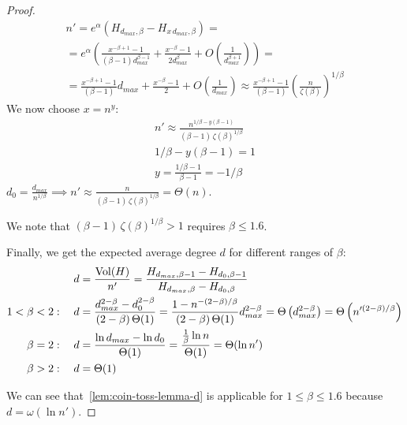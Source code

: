 \begin{proof}
\begin{gather*}
        n'=e^\alpha\left(H_{d_{max},\beta}-H_{x\,d_{max},\beta}\right)=\\
        =e^\alpha\left(
            \frac{x^{-\beta+1}-1}{(\beta-1)d_{max}^{\beta-1}}
            +\frac{x^{-\beta}-1}{2d_{max}^\beta}
            +O\left(\frac{1}{d_{max}^{\beta+1}}\right)
        \right)=\\
        =\frac{x^{-\beta+1}-1}{(\beta-1)}d_{max}
        +\frac{x^{-\beta}-1}{2}
        +O\left(\frac{1}{d_{max}}\right)
        \approx\frac{x^{-\beta+1}-1}{(\beta-1)}\left(\frac{n}{\zeta(\beta)}\right)^{1/\beta}
    \end{gather*}
    We now choose $x=n^y$:
    \begin{gather*}
        n'\approx\frac{n^{1/\beta-y(\beta-1)}}{(\beta-1)\,\zeta(\beta)^{1/\beta}}\\
        1/\beta-y(\beta-1)=1\\
        y=\frac{1/\beta-1}{\beta-1}=-1/\beta
    \end{gather*}
    $d_0=\frac{d_{max}}{n^{1/\beta}}\implies
    n'\approx\frac{n}{(\beta-1)\,\zeta(\beta)^{1/\beta}}=\Theta(n)$.
        
    We note that $(\beta-1)\,\zeta(\beta)^{1/\beta}>1$ requires $\beta\leq 1.6$.

    Finally, we get the expected average degree $d$ for different ranges of $\beta$:
    \begin{align*}
        d&=\frac{\operatorname*{Vol}(H)}{n'}=\frac{H_{d_{max},\beta-1}-H_{d_0,\beta-1}}{H_{d_{max},\beta}-H_{d_0,\beta}}\\
        1<\beta<2:\quad d&=\frac{d_{max}^{2-\beta}-d_0^{2-\beta}}{(2-\beta)\,\Theta(1)}
        =\frac{1-n^{-(2-\beta)/\beta}}{(2-\beta)\,\Theta(1)}d_{max}^{2-\beta}=\Theta\left(d_{max}^{2-\beta}\right)=\Theta\left(n'^{(2-\beta)/\beta}\right)\\
        \beta=2:\quad d&=\frac{\ln d_{max}-\ln d_0}{\Theta(1)}=\frac{\frac{1}{\beta}\ln n}{\Theta(1)}=\Theta(\ln n')\\
        \beta>2:\quad d&=\Theta(1)
    \end{align*}
    
    We can see that~\autoref{lem:coin-toss-lemma-d} is applicable for
    $1\leq\beta\leq 1.6$ because $d=\omega(\ln n')$.
\end{proof}

